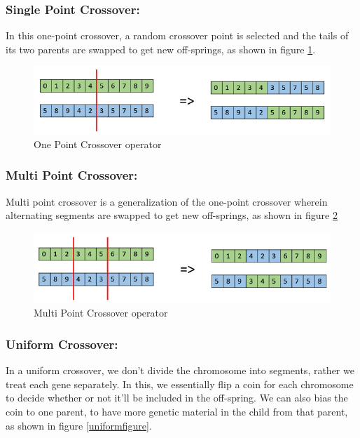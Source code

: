\subsubsection{Single Point Crossover:}
In this one-point crossover, a random crossover point is selected and the tails of its two parents are swapped to get new off-springs, as shown in figure \ref{onePointfigure}.

\begin{figure}[h]
	\centering
	\includegraphics[scale=0.45]{imagenes/one_point_crossover.png}
    \caption{One Point Crossover operator}
    \label{onePointfigure}
\end{figure}

\subsubsection{Multi Point Crossover:}
Multi point crossover is a generalization of the one-point crossover wherein alternating segments are swapped to get new off-springs, as shown in figure \ref{MultiPointfigure}

\begin{figure}[h]
	\centering
	\includegraphics[scale=0.45]{imagenes/multi_point_crossover.png}
    \caption{Multi Point Crossover operator}
    \label{MultiPointfigure}
\end{figure}

\subsubsection{Uniform Crossover:}
In a uniform crossover, we don’t divide the chromosome into segments, rather we treat each gene separately. In this, we essentially flip a coin for each chromosome to decide whether or not it’ll be included in the off-spring. We can also bias the coin to one parent, to have more genetic material in the child from that parent, as shown in figure \ref{uniformfigure}.

